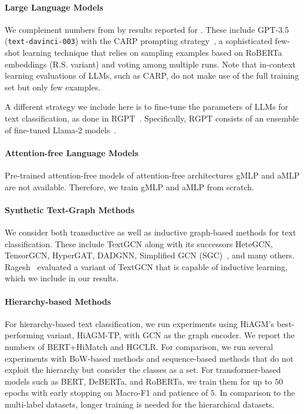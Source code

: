 \paragraph{Large Language Models}
We complement numbers from \SLMs by results reported for \LLMs.
These include GPT-3.5 (\texttt{text-davinci-003}) with the CARP prompting strategy~\cite{carp}, a sophisticated few-shot learning technique that relies on sampling examples based on RoBERTa embeddings (R.S. variant) and voting among multiple runs. 
Note that in-context learning evaluations of LLMs, such as CARP, do not make use of the full training set but only few examples. 

A different strategy we include here is to fine-tune the parameters of LLMs for text classification, as done in RGPT~\cite{DBLP:journals/corr/abs-2402-07470-pushing-the-limit}. Specifically, RGPT consists of an ensemble of fine-tuned Llama-2 models~\cite{touvronLlamaOpenFoundation2023}.

\paragraph{Attention-free Language Models}
Pre-trained attention-free models of attention-free architectures gMLP and aMLP are not available. Therefore, we train gMLP and aMLP from scratch.

\paragraph{Synthetic Text-Graph Methods}

We consider both transductive as well as inductive graph-based methods for text classification.
These include TextGCN along with its successors HeteGCN, TensorGCN, HyperGAT,
DADGNN, Simplified GCN (SGC)~\cite{DBLP:conf/icml/WuSZFYW19}, and many others.
Ragesh~\etal\cite{DBLP:conf/wsdm/RageshSIBL21} evaluated a variant of TextGCN that is capable of inductive learning, which we include in our results. 

\paragraph{Hierarchy-based Methods}
\label{sec:hiagm}
\label{sec:Hierarchy-based-Text-Classification}
For hierarchy-based text classification, we run experiments using HiAGM's best-performing variant, HiAGM-TP, with GCN as the graph encoder.
We report the numbers of BERT+HiMatch and HGCLR.
For comparison, we run several experiments with BoW-based methods and sequence-based methods that do not exploit the hierarchy but consider the classes as a set.
For transformer-based models such as BERT, DeBERTa, and RoBERTa, we train them for up to $50$ epochs with early stopping on Macro-F1 and patience of $5$.
In comparison to the multi-label datasets, longer training is needed for the hierarchical datasets.

